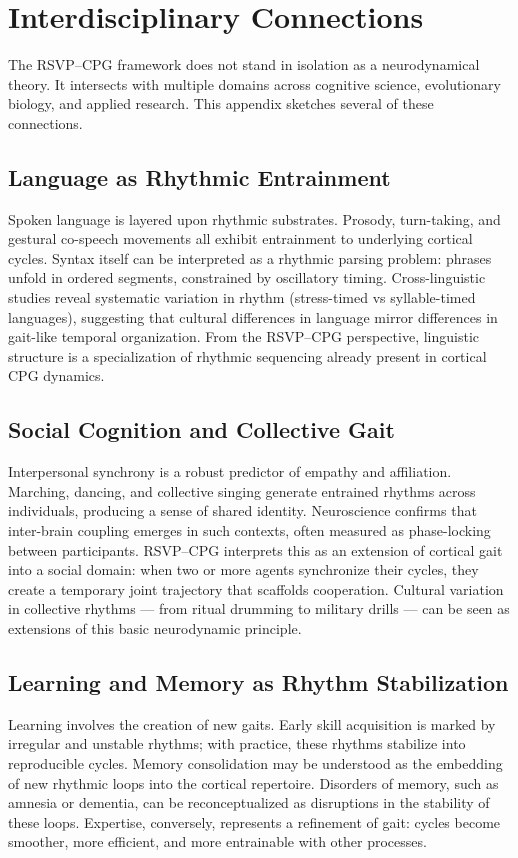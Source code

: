 \documentclass{article}
\begin{document}
\section{Interdisciplinary Connections}
\label{app:interdisciplinary}

The RSVP--CPG framework does not stand in isolation as a neurodynamical theory.  
It intersects with multiple domains across cognitive science, evolutionary biology, 
and applied research. This appendix sketches several of these connections.  

\subsection{Language as Rhythmic Entrainment}
Spoken language is layered upon rhythmic substrates.  
Prosody, turn-taking, and gestural co-speech movements all exhibit entrainment 
to underlying cortical cycles. Syntax itself can be interpreted as a rhythmic parsing problem: 
phrases unfold in ordered segments, constrained by oscillatory timing.  
Cross-linguistic studies reveal systematic variation in rhythm (stress-timed vs syllable-timed languages), 
suggesting that cultural differences in language mirror differences in gait-like temporal organization.  
From the RSVP--CPG perspective, linguistic structure is a specialization of rhythmic sequencing already present 
in cortical CPG dynamics.  

\subsection{Social Cognition and Collective Gait}
Interpersonal synchrony is a robust predictor of empathy and affiliation.  
Marching, dancing, and collective singing generate entrained rhythms across individuals, 
producing a sense of shared identity. Neuroscience confirms that inter-brain coupling emerges 
in such contexts, often measured as phase-locking between participants.  
RSVP--CPG interprets this as an extension of cortical gait into a social domain: 
when two or more agents synchronize their cycles, they create a temporary joint trajectory 
that scaffolds cooperation. Cultural variation in collective rhythms --- from ritual drumming 
to military drills --- can be seen as extensions of this basic neurodynamic principle.  

\subsection{Learning and Memory as Rhythm Stabilization}
Learning involves the creation of new gaits.  
Early skill acquisition is marked by irregular and unstable rhythms; with practice, 
these rhythms stabilize into reproducible cycles. Memory consolidation may be understood 
as the embedding of new rhythmic loops into the cortical repertoire.  
Disorders of memory, such as amnesia or dementia, can be reconceptualized as disruptions 
in the stability of these loops. Expertise, conversely, represents a refinement of gait: 
cycles become smoother, more efficient, and more entrainable with other processes.  
\end{document}
